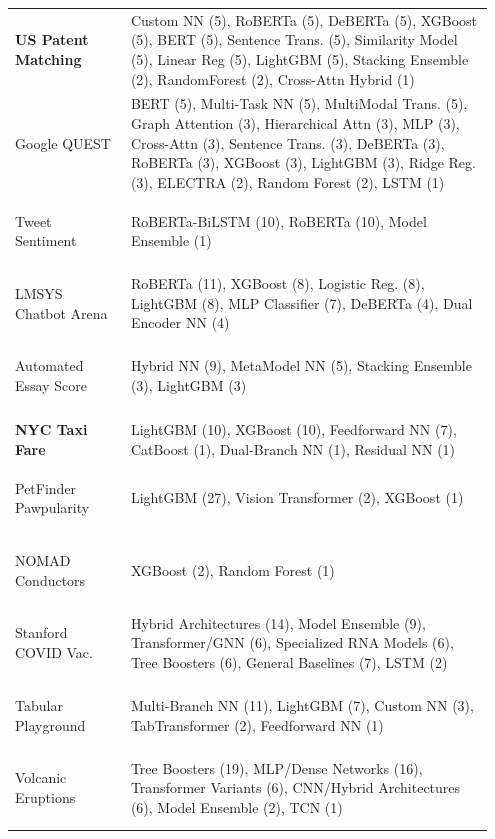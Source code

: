 \begin{table}[t!]
\begin{tabular}{
        >{\raggedright\arraybackslash\bfseries}p{0.23\linewidth} 
        >{\raggedright\arraybackslash}p{0.72\linewidth}
    }
    US Patent Matching & Custom NN (5), RoBERTa (5), DeBERTa (5), XGBoost (5), BERT (5), Sentence Trans. (5), Similarity Model (5), Linear Reg (5), LightGBM (5), Stacking Ensemble (2), RandomForest (2), Cross-Attn Hybrid (1) \\ \addlinespace
    
    Google QUEST & BERT (5), Multi-Task NN (5), MultiModal Trans. (5), Graph Attention (3), Hierarchical Attn (3), MLP (3), Cross-Attn (3), Sentence Trans. (3), DeBERTa (3), RoBERTa (3), XGBoost (3), LightGBM (3), Ridge Reg. (3), ELECTRA (2), Random Forest (2), LSTM (1) \\ \addlinespace
    
    Tweet Sentiment & RoBERTa-BiLSTM (10), RoBERTa (10), Model Ensemble (1) \\ \addlinespace
    
    LMSYS Chatbot Arena & RoBERTa (11), XGBoost (8), Logistic Reg. (8), LightGBM (8), MLP Classifier (7), DeBERTa (4), Dual Encoder NN (4) \\ \addlinespace
    
    Automated Essay Score & Hybrid NN (9), MetaModel NN (5), Stacking Ensemble (3), LightGBM (3) \\ \addlinespace
    
    \multicolumn{2}{l}{\cellcolor{gray!15}\textbf{\textit{Data Science Domain}}} \\
    \midrule
    NYC Taxi Fare & LightGBM (10), XGBoost (10), Feedforward NN (7), CatBoost (1), Dual-Branch NN (1), Residual NN (1) \\ \addlinespace
    
    PetFinder Pawpularity & LightGBM (27), Vision Transformer (2), XGBoost (1) \\ \addlinespace
    
    NOMAD Conductors & XGBoost (2), Random Forest (1) \\ \addlinespace
    
    Stanford COVID Vac. & Hybrid Architectures (14), Model Ensemble (9), Transformer/GNN (6), Specialized RNA Models (6), Tree Boosters (6), General Baselines (7), LSTM (2) \\ \addlinespace
    
    Tabular Playground & Multi-Branch NN (11), LightGBM (7), Custom NN (3), TabTransformer (2), Feedforward NN (1) \\ \addlinespace
    
    Volcanic Eruptions & Tree Boosters (19), MLP/Dense Networks (16), Transformer Variants (6), CNN/Hybrid Architectures (6), Model Ensemble (2), TCN (1) \\ \addlinespace


\end{tabular}
\end{table}

